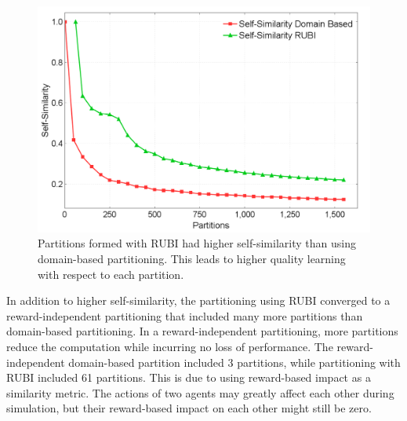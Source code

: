 \documentclass[letterpaper]{article}
\begin{document}
\begin{figure}
\centering
\includegraphics[width=.75\columnwidth]{Self-SimOldvsSelf-SimNew}
\caption{Partitions formed with RUBI had higher self-similarity than using domain-based partitioning. This leads to higher quality learning with respect to each partition.}
\label{Self-SimOldvsSelf-SimNew}
\end{figure}

In addition to higher self-similarity, the partitioning using RUBI converged to a reward-independent partitioning that included many more partitions than domain-based partitioning. In a reward-independent partitioning, more partitions reduce the computation while incurring no loss of performance. The reward-independent domain-based partition included 3 partitions, while partitioning with RUBI included 61 partitions. This is due to using reward-based impact as a similarity metric. The actions of two agents may greatly affect each other during simulation, but their reward-based impact on each other might still be zero. %

\end{document}
